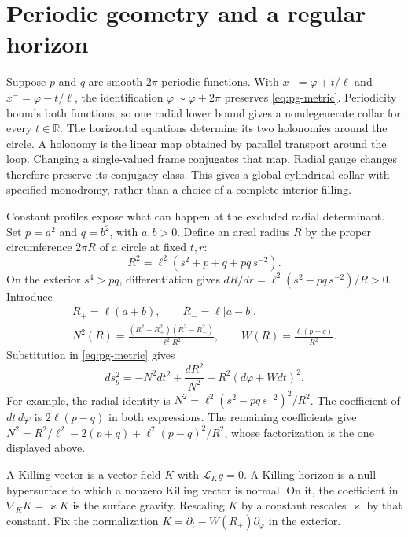 \section{Periodic geometry and a regular horizon}

Suppose $p$ and $q$ are smooth $2\pi$-periodic functions.
With $x^+=\varphi+t/\ell$ and $x^-=\varphi-t/\ell$, the identification
$\varphi\sim\varphi+2\pi$ preserves \eqref{eq:pg-metric}.
Periodicity bounds both functions, so one radial lower bound gives a nondegenerate collar for every $t\in\mathbb R$.
The horizontal equations determine its two holonomies around the circle.
A holonomy is the linear map obtained by parallel transport around the loop.
Changing a single-valued frame conjugates that map.
Radial gauge changes therefore preserve its conjugacy class.
This gives a global cylindrical collar with specified monodromy, rather than a choice of a complete interior filling.

Constant profiles expose what can happen at the excluded radial determinant.
Set $p=a^2$ and $q=b^2$, with $a,b>0$.
Define an areal radius $R$ by the proper circumference $2\pi R$ of a circle at fixed $t,r$:
\[
 R^2=\ell^2(s^2+p+q+pq\,s^{-2}).
\]
On the exterior $s^4>pq$, differentiation gives $dR/dr=\ell^2(s^2-pq\,s^{-2})/R>0$.
Introduce
\[
 \begin{gathered}
 R_+=\ell(a+b),\qquad R_-=\ell|a-b|,\\
 N^2(R)=\frac{(R^2-R_+^2)(R^2-R_-^2)}{\ell^2R^2},\qquad
 W(R)=\frac{\ell(p-q)}{R^2}.
 \end{gathered}
\]
Substitution in \eqref{eq:pg-metric} gives
\begin{equation}\label{eq:pg-areal}
 ds_g^2=-N^2dt^2+\frac{dR^2}{N^2}+R^2(d\varphi+Wdt)^2.
\end{equation}
For example, the radial identity is
$N^2=\ell^2(s^2-pq\,s^{-2})^2/R^2$.
The coefficient of $dt\,d\varphi$ is $2\ell(p-q)$ in both expressions.
The remaining coefficients give
$N^2=R^2/\ell^2-2(p+q)+\ell^2(p-q)^2/R^2$, whose factorization is the one displayed above.

A Killing vector is a vector field $K$ with $\mathcal L_Kg=0$.
A Killing horizon is a null hypersurface to which a nonzero Killing vector is normal.
On it, the coefficient in $\nabla_KK=\varkappa K$ is the surface gravity.
Rescaling $K$ by a constant rescales $\varkappa$ by that constant.
Fix the normalization $K=\partial_t-W(R_+)\partial_\varphi$ in the exterior.

